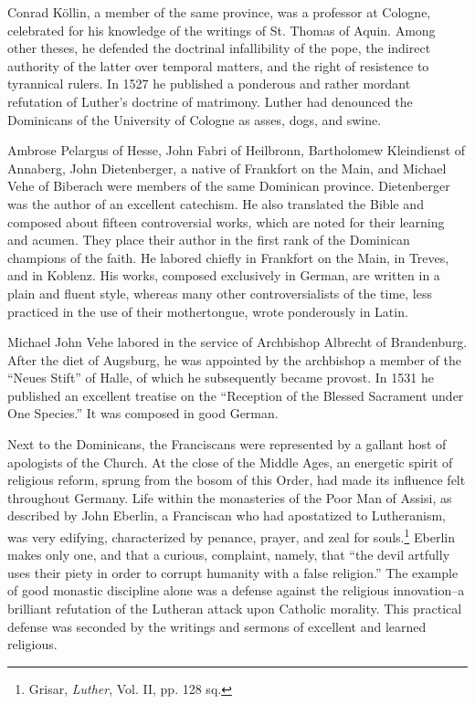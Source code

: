 Conrad Köllin, a member of the same province, was a professor
at Cologne, celebrated for his knowledge of the writings of St.
Thomas of Aquin. Among other theses, he defended the doctrinal
infallibility of the pope, the indirect authority of the latter over temporal
matters, and the right of resistence to tyrannical rulers. In 1527
he published a ponderous and rather mordant refutation of Luther’s
doctrine of matrimony. Luther had denounced the Dominicans of the
University of Cologne as asses, dogs, and swine.

Ambrose Pelargus of Hesse, John Fabri of Heilbronn, Bartholomew
Kleindienst of Annaberg, John Dietenberger, a native of Frankfort
on the Main, and Michael Vehe of Biberach were members of
the same Dominican province. Dietenberger was the author of an
excellent catechism. He also translated the Bible and composed about
fifteen controversial works, which are noted for their learning and
acumen. They place their author in the first rank of the Dominican
champions of the faith. He labored chiefly in Frankfort on the Main,
in Treves, and in Koblenz. His works, composed exclusively in German, are
written in a plain and fluent style, whereas many other
controversialists of the time, less practiced in the use of their mothertongue,
wrote ponderously in Latin.

Michael John Vehe labored in the service of Archbishop Albrecht
of Brandenburg. After the diet of Augsburg, he was appointed by
the archbishop a member of the “Neues Stift” of Halle, of which he
subsequently became provost. In 1531 he published an excellent treatise
on the “Reception of the Blessed Sacrament under One Species.”
It was composed in good German.

Next to the Dominicans, the Franciscans were represented by a
gallant host of apologists of the Church. At the close of the Middle
Ages, an energetic spirit of religious reform, sprung from the bosom
of this Order, had made its influence felt throughout Germany. Life
within the monasteries of the Poor Man of Assisi, as described by
John Eberlin, a Franciscan who had apostatized to Lutheranism, was
very edifying, characterized by penance, prayer, and zeal for souls.\footnote
{Grisar, \textit{Luther}, Vol. II, pp. 128 sq.}
Eberlin makes only one, and that a curious, complaint, namely, that
“the devil artfully uses their piety in order to corrupt humanity
with a false religion.” The example of good monastic discipline alone
was a defense against the religious innovation--a brilliant refutation
of the Lutheran attack upon Catholic morality. This practical defense was
seconded by the writings and sermons of excellent and
learned religious.

